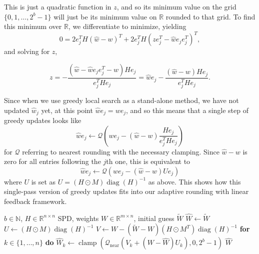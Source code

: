 This is just a quadratic function in $z$, and so its minimum value on the grid $\{0, 1, \ldots, 2^{b} - 1\}$ will just be its minimum value on $\mathbb{R}$ rounded to that grid. To find this minimum over $\mathbb{R}$, we differentiate to minimize, yielding
\[
    0 = 2 e_j^T H (\hat w - w)^T + 2 e_j^T H (z e_j^T - \hat w e_j e_j^T)^T,
\]
and solving for $z$,

\begin{equation}
    \label{eqnGreedyZ}
    z
    =
    -
    \frac{
        (\hat w - \hat w e_j e_j^T - w) H e_j
    }{
        e_j^T H e_j
    }
    =
    \hat w e_j
    -
    \frac{
        (\hat w - w) H e_j
    }{
        e_j^T H e_j
    }.
\end{equation}

Since when we use greedy local search as a stand-alone method, we have not updated $\hat w_j$ yet, at this point $\hat w e_j = w e_j$, and so this means that a single step of greedy updates looks like
\[
    \hat w e_j \gets \mathcal{Q}\left( w e_j - (\hat w - w) \frac{
        H e_j }{ e_j^T H e_j } \right)
\]
for $\mathcal{Q}$ referring to nearest rounding with the necessary clamping. Since $\hat w - w$ is zero for all entries following the $j$th one, this is equivalent to 
\[
    \hat w e_j \gets \mathcal{Q}( w e_j - (\hat w - w) U e_j )
\]
where $U$ is set as $U = (H \odot M) \operatorname{diag}(H)^{-1}$ as above. This shows how this single-pass version of greedy updates fits into our adaptive rounding with linear feedback framework.

\begin{algorithm}[t]
\caption{Greedy Updates: A Single Pass}\label{algSuppGreedy}
\begin{algorithmic}[1]
\Require $b \in \mathbb{N}$, $H \in \mathbb{R}^{n \times n}$ SPD, weights $W \in \mathbb{R}^{m \times n}$, initial guess $\tilde W$
\State $\hat W \gets \tilde W$
\State $U \gets (H \odot M) \operatorname{diag}(H)^{-1}$ 
\State $V \gets W - (\tilde W - W) (H \odot M^T) \operatorname{diag}(H)^{-1}$ 
\State \textbf{for} $k \in \{1, \dots, n\}$ \textbf{do}  
$\hat W_k \gets \operatorname{clamp}(\mathcal{Q}_{\operatorname{near}}( V_k + (W - \hat W) U_k ), 0, 2^b-1)$
\State \Return $\hat W$ 
\end{algorithmic}
\end{algorithm}

